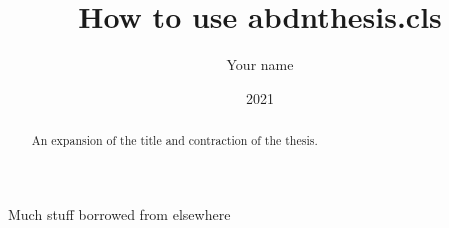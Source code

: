 \documentclass[MSc]{abdnthesis}
\title{How to use abdnthesis.cls}
\author{Your name}
\date{2021}
\begin{document}

\maketitle
\makedeclaration


\begin{abstract}
  An expansion of the title and contraction of the thesis.
\end{abstract}

\begin{acknowledgements}
  Much stuff borrowed from elsewhere
\end{acknowledgements}



\tableofcontents











\appendix



\end{document}
